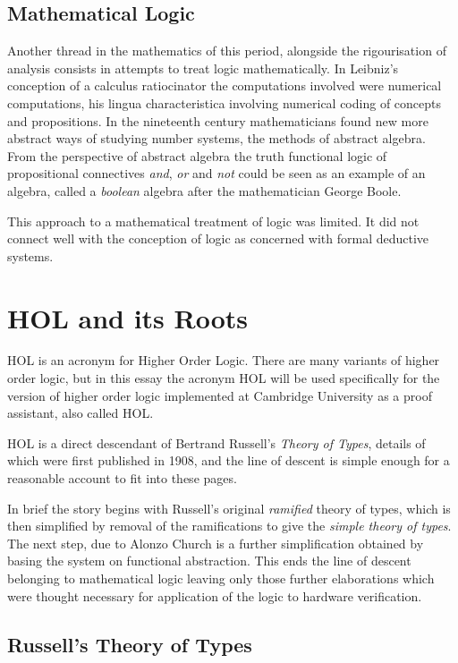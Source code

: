 \documentclass[10pt,titlepage]{book}
\begin{document}
\subsection{Mathematical Logic}

Another thread in the mathematics of this period, alongside the rigourisation of analysis consists in attempts to treat logic mathematically.
In Leibniz's conception of a calculus ratiocinator the computations involved were numerical computations, his lingua characteristica involving numerical coding of concepts and propositions.
In the nineteenth century mathematicians found new more abstract ways of studying number systems, the methods of abstract algebra.
From the perspective of abstract algebra the truth functional logic of propositional connectives {\it and}, {\it or} and {\it not} could be seen as an example of an algebra, called a {\it boolean} algebra after the mathematician George Boole.

This approach to a mathematical treatment of logic was limited.
It did not connect well with the conception of logic as concerned with formal deductive systems.

\section{HOL and its Roots}

HOL is an acronym for Higher Order Logic.
There are many variants of higher order logic, but in this essay the acronym HOL will be used specifically for the version of higher order logic implemented at Cambridge University as a proof assistant, also called HOL.

HOL is a direct descendant of Bertrand Russell's {\it Theory of Types}, details of which were first published in 1908, and the line of descent is simple enough for a reasonable account to fit into these pages.

In brief the story begins with Russell's original {\it ramified} theory of types\cite{russell08}, which is then simplified by removal of the ramifications to give the {\it simple theory of types}.
The next step, due to Alonzo Church\cite{church40} is a further simplification obtained by basing the system on functional abstraction.
This ends the line of descent belonging to mathematical logic leaving only those further elaborations which were thought necessary for application of the logic to hardware verification.

\subsection{Russell's Theory of Types}
\end{document}
